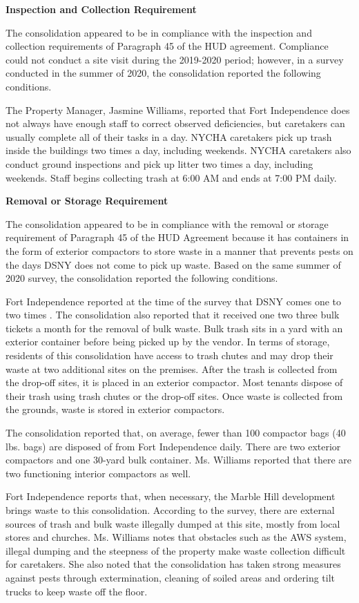 
\textbf{Inspection and Collection Requirement}

The consolidation appeared to be in compliance with the inspection and collection requirements of Paragraph 45 of the HUD agreement. Compliance could not conduct a site visit during the 2019-2020 period; however, in a survey conducted in the summer of 2020, the consolidation reported the following conditions.

The Property Manager, Jasmine Williams, reported that Fort Independence does not always have enough staff to correct observed deficiencies, but caretakers can usually complete all of their tasks in a day. NYCHA caretakers pick up trash inside the buildings two times a day, including weekends. NYCHA caretakers also conduct ground inspections and pick up litter two times a day, including weekends. Staff begins collecting trash at 6:00 AM and ends at 7:00 PM daily.

\textbf{Removal or Storage Requirement}

The consolidation appeared to be in compliance with the  removal or storage requirement of Paragraph  45 of the HUD Agreement because it has containers in the form of exterior compactors to store waste in a manner that prevents pests on the days DSNY does not come to pick up waste. Based on the same summer of  2020 survey, the consolidation reported the following conditions.

Fort Independence reported at the time of the survey that DSNY comes one to two times . The consolidation also reported that it received one two three bulk tickets a month for the removal of bulk waste. Bulk trash sits in a yard with an exterior container before being picked up by the vendor. In terms of storage, residents of this consolidation have access to trash chutes and may drop their waste at two additional sites on the premises. After the trash is collected from the drop-off sites, it is placed in an exterior compactor. Most tenants dispose of their trash using trash chutes or the drop-off sites. Once waste is collected from the grounds, waste is stored in exterior compactors. 

The consolidation reported that, on average, fewer than 100 compactor bags (40 lbs. bags) are disposed of from Fort Independence daily. There are two exterior compactors and one 30-yard bulk container. Ms. Williams reported that there are two functioning interior compactors as well.

Fort Independence reports that, when necessary, the Marble Hill development brings waste to this consolidation. According to the survey, there are external sources of trash and bulk waste illegally dumped at this site, mostly from local stores and churches. Ms. Williams notes that obstacles such as the AWS system, illegal dumping and the steepness of the property make waste collection difficult for caretakers. She also noted that the consolidation has taken strong measures against pests through extermination, cleaning of soiled areas and ordering tilt trucks to keep waste off the floor.